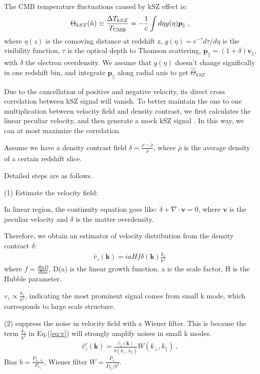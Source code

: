 \label{sec:kszRecon}
The CMB temperature fluctuations caused by kSZ effect is:
\begin{eqnarray}
\label{eq:ksz}
\Theta_{kSZ}(\hat n)\equiv\frac{\Delta T_{kSZ}}{T_{\mathrm{CMB}}}
=-\frac{1}{c}\int d\eta  g(\eta)  \bm{p}_\parallel\ ,
\end{eqnarray}
where $\eta(z)$ is the comoving distance at redshift z, $g(\eta)=e^{-\tau} d\tau/d\eta$ is the visibility function, $\tau$ is the optical depth to Thomson scattering, $\bm{p}_\parallel=(1+\delta)\bm{v}_\parallel$, with $\delta$ the electron overdensity. 
We assume that $g(\eta)$ doesn't change significally in one redshift bin, 
and integrate $\bm{p}_\parallel$ along radial axis to get $\hat \Theta_{kSZ}$

Due to the cancellation of positive and negative velocity, its direct cross correlation between kSZ signal will vanish.
To better maintain the one to one multiplication between velocity field and density contrast, 
we first calculates the linear peculiar velocity, and then generate a mock kSZ signal 
\cite{Shao11}.
In this way, we can at most maximize the correlation.

Assume we have a density contrast field $\delta=\frac{\rho-\bar{\rho}}{\bar{\rho}}$, where $\bar\rho$ is the average density of a certain redshift slice. 

Detailed steps are as follows.

(1) Estimate the velocity field:

In linear region, the continuity equation goes like:
$\dot \delta+\nabla \cdot \bm{v}=0$, 
where $\bm{v}$ is the peculiar velocity and $\delta$ is the matter overdensity. 

Therefore, we obtain an estimator of velocity distribution from the density contract $\delta$:
\begin{eqnarray}
	\label{eq:v}
\hat v_z(\bm{k})=i a H f\delta(\bm{k})\frac{k_z}{k^2}\,
\end{eqnarray}
where $f=\frac{d\mathrm{ln}D}{d\mathrm{ln}a}$, D(a) is the linear growth function, 
a is the scale factor, H is the Hubble parameter.

$v_z \propto \frac{k_z}{k^2}$, indicating the most prominent signal comes from small k mode, which corresponds to large scale structure. 

(2) suppress the noise in velocity field with a Wiener filter. 
This is because the term $\frac{k_z}{k^2}$ in Eq.(\ref{eq:v}) will strongly amplify noises in small k modes. 
\begin{eqnarray}
	\label{eq:wienerv}
\hat v_z^c(\bm{k})=\frac{\hat v_z(\bm{k})}{b(k_\perp,k_\parallel)}W(k_\perp,k_\parallel)\ ,
\end{eqnarray}
Bias $b=\frac{P_{\hat v_z,v_z}}{P_{v_z}}$, Wiener filter $W=\frac{P_{v_z}}{P_{\hat v_z}/b^2}$.

